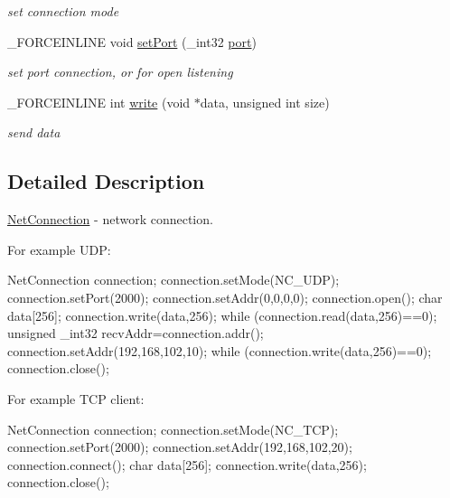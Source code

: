 \begin{DoxyCompactItemize}
\begin{DoxyCompactList}\small\item\em set connection mode \end{DoxyCompactList}\item 
\hypertarget{classcsad_1_1_net_connection_ac888de6d8682f77b9397baf4678064dd}{\-\_\-\-F\-O\-R\-C\-E\-I\-N\-L\-I\-N\-E void \hyperlink{classcsad_1_1_net_connection_ac888de6d8682f77b9397baf4678064dd}{set\-Port} (\-\_\-int32 \hyperlink{classcsad_1_1_net_connection_acb26734ada988518925467b18447d54e}{port})}\label{classcsad_1_1_net_connection_ac888de6d8682f77b9397baf4678064dd}

\begin{DoxyCompactList}\small\item\em set port connection, or for open listening \end{DoxyCompactList}\item 
\hypertarget{classcsad_1_1_net_connection_a62442d45c39493be16ce3d5377aede73}{\-\_\-\-F\-O\-R\-C\-E\-I\-N\-L\-I\-N\-E int \hyperlink{classcsad_1_1_net_connection_a62442d45c39493be16ce3d5377aede73}{write} (void $\ast$data, unsigned int size)}\label{classcsad_1_1_net_connection_a62442d45c39493be16ce3d5377aede73}

\begin{DoxyCompactList}\small\item\em send data \end{DoxyCompactList}\end{DoxyCompactItemize}


\subsection{Detailed Description}
\hyperlink{classcsad_1_1_net_connection}{Net\-Connection} -\/ network connection. 

For example U\-D\-P\-: \begin{DoxyVerb}  NetConnection connection;
  connection.setMode(NC_UDP);
  connection.setPort(2000);
  connection.setAddr(0,0,0,0);
  connection.open();
  char data[256];
  connection.write(data,256);
  while (connection.read(data,256)==0);
  unsigned _int32 recvAddr=connection.addr();
  connection.setAddr(192,168,102,10);
  while (connection.write(data,256)==0);
  connection.close();
\end{DoxyVerb}


For example T\-C\-P client\-: \begin{DoxyVerb}  NetConnection connection;
  connection.setMode(NC_TCP);
  connection.setPort(2000);
  connection.setAddr(192,168,102,20);
  connection.connect();
  char data[256];
  connection.write(data,256);
  connection.close();
\end{DoxyVerb}


